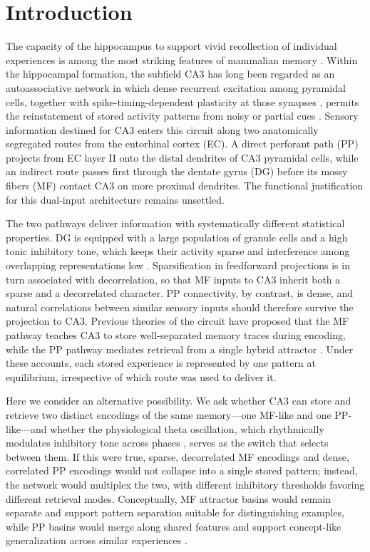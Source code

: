 \section{Introduction}

The capacity of the hippocampus to support vivid recollection of individual experiences is among the most striking features of mammalian memory \cite{scoville1957loss}. Within the hippocampal formation, the subfield CA3 has long been regarded as an autoassociative network in which dense recurrent excitation among pyramidal cells, together with spike-timing-dependent plasticity at those synapses \cite{bi1998synaptic}, permits the reinstatement of stored activity patterns from noisy or partial cues \cite{mcnaughton1987hippocampal,hopfield1982neural}. Sensory information destined for CA3 enters this circuit along two anatomically segregated routes from the entorhinal cortex (EC). A direct perforant path (PP) projects from EC layer II onto the distal dendrites of CA3 pyramidal cells, while an indirect route passes first through the dentate gyrus (DG) before its mossy fibers (MF) contact CA3 on more proximal dendrites. The functional justification for this dual-input architecture remains unsettled.

The two pathways deliver information with systematically different statistical properties. DG is equipped with a large population of granule cells and a high tonic inhibitory tone, which keeps their activity sparse and interference among overlapping representations low \cite{engin2015tonic,leutgeb2007pattern}. Sparsification in feedforward projections is in turn associated with decorrelation, so that MF inputs to CA3 inherit both a sparse and a decorrelated character. PP connectivity, by contrast, is dense, and natural correlations between similar sensory inputs should therefore survive the projection to CA3. Previous theories of the circuit have proposed that the MF pathway teaches CA3 to store well-separated memory traces during encoding, while the PP pathway mediates retrieval from a single hybrid attractor \cite{treves1992computational}. Under these accounts, each stored experience is represented by one pattern at equilibrium, irrespective of which route was used to deliver it.

Here we consider an alternative possibility. We ask whether CA3 can store and retrieve two distinct encodings of the same memory---one MF-like and one PP-like---and whether the physiological theta oscillation, which rhythmically modulates inhibitory tone across phases \cite{tsodyks1996population}, serves as the switch that selects between them. If this were true, sparse, decorrelated MF encodings and dense, correlated PP encodings would not collapse into a single stored pattern; instead, the network would multiplex the two, with different inhibitory thresholds favoring different retrieval modes. Conceptually, MF attractor basins would remain separate and support pattern separation suitable for distinguishing examples, while PP basins would merge along shared features and support concept-like generalization across similar experiences \cite{quiroga2005invariant,knowlton1993learning,zeithamova2019brain}.

